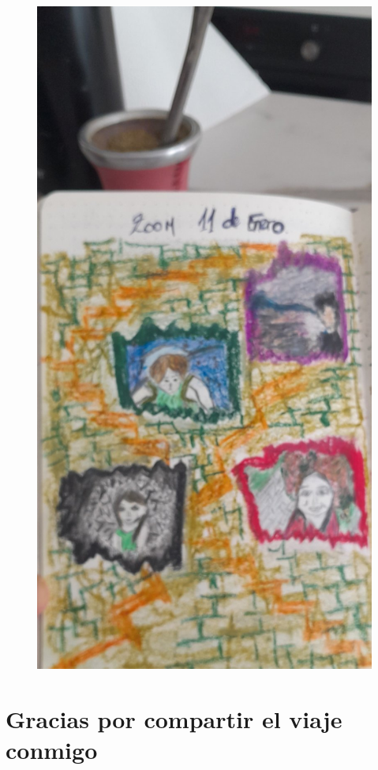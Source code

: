 \documentclass[12pt, a4paper, twoside]{book} %
\begin{document}
\begin{figure}[H]
	\centering
	\includegraphics[width=\textwidth]{./images/1f81324ddf1fdd.jpg}
\end{figure}

\chapter{Gracias por compartir el viaje conmigo}
\end{document}

